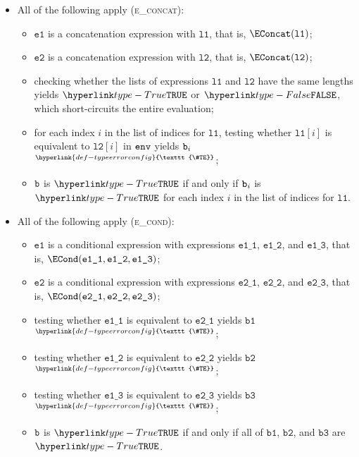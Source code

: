 \documentclass{book}
\newcommand\TypeErrorConfig[0]{\hyperlink{def-typeerrorconfig}{\texttt{\#TE}}}
\newcommand\ProseOrTypeError[0]{\hyperlink{def-proseortypeerror}{$^{\TypeErrorConfig}$}}
\newcommand\veone[0]{\texttt{e1}}
\newcommand\vetwo[0]{\texttt{e2}}
\newcommand\veoneone[0]{\texttt{e1\_1}}
\newcommand\veonetwo[0]{\texttt{e1\_2}}
\newcommand\veonethree[0]{\texttt{e1\_3}}
\newcommand\vetwoone[0]{\texttt{e2\_1}}
\newcommand\vetwotwo[0]{\texttt{e2\_2}}
\newcommand\vetwothree[0]{\texttt{e2\_3}}
\newcommand\vbone[0]{\texttt{b1}}
\newcommand\vbtwo[0]{\texttt{b2}}
\newcommand\vbthree[0]{\texttt{b3}}
\newcommand\vlone[0]{\texttt{l1}}
\newcommand\vltwo[0]{\texttt{l2}}
\begin{document}
\begin{itemize}
  \item All of the following apply (\textsc{e\_concat}):
  \begin{itemize}
    \item $\veone$ is a concatenation expression with $\vlone$, that is, $\EConcat(\vlone)$;
    \item $\vetwo$ is a concatenation expression with $\vltwo$, that is, $\EConcat(\vltwo)$;
    \item checking whether the lists of expressions $\vlone$ and $\vltwo$ have the same lengths yields
          $\True$ or $\False$, which short-circuits the entire evaluation;
    \item for each index $i$ in the list of indices for $\vlone$, testing whether $\vlone[i]$ is equivalent to $\vltwo[i]$
          in $\texttt{env}$ yields $\texttt{b}_i$ \ProseOrTypeError;
    \item $\texttt{b}$ is $\True$ if and only if $\texttt{b}_i$ is $\True$ for each index $i$ in the list of indices for $\vlone$.
  \end{itemize}

  \item All of the following apply (\textsc{e\_cond}):
  \begin{itemize}
    \item $\veone$ is a conditional expression with expressions $\veoneone$, $\veonetwo$, and $\veonethree$,
          that is, $\ECond(\veoneone, \veonetwo, \veonethree)$;
    \item $\vetwo$ is a conditional expression with expressions $\vetwoone$, $\vetwotwo$, and $\vetwothree$,
          that is, $\ECond(\vetwoone, \vetwotwo, \vetwothree)$;
    \item testing whether $\veoneone$ is equivalent to $\vetwoone$ yields $\vbone$ \ProseOrTypeError;
    \item testing whether $\veonetwo$ is equivalent to $\vetwotwo$ yields $\vbtwo$ \ProseOrTypeError;
    \item testing whether $\veonethree$ is equivalent to $\vetwothree$ yields $\vbthree$ \ProseOrTypeError;
    \item $\texttt{b}$ is $\True$ if and only if all of $\vbone$, $\vbtwo$, and $\vbthree$ are $\True$.
  \end{itemize}


\end{itemize}
\end{document}
